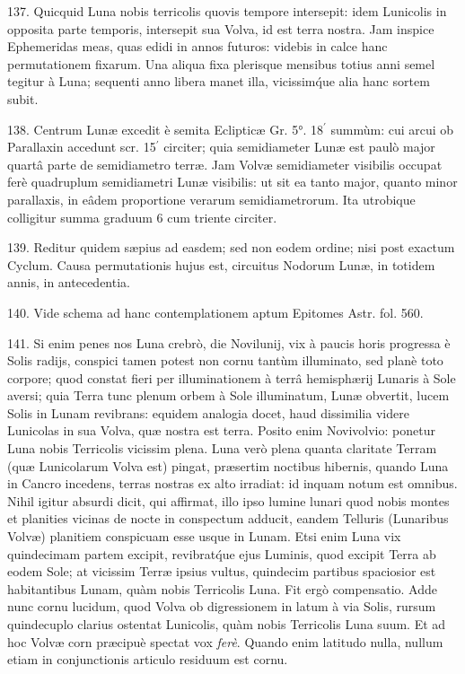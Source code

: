 \documentclass[a4paper, 11pt, oneside, polutonikogreek, german]{article}
\begin{document}
137. Quicquid Luna nobis terricolis quovis tempore intersepit: idem Lunicolis in opposita parte temporis, intersepit sua Volva, id est terra nostra. Jam inspice Ephemeridas meas, quas edidi in annos futuros: videbis in calce hanc permutationem fixarum. Una aliqua fixa plerisque mensibus totius anni semel tegitur à Luna; sequenti anno libera manet illa, vicissim\'que alia hanc sortem subit.

138. Centrum Lunæ excedit è semita Eclipticæ Gr. 5°. 18$^{\prime}$ summùm: cui arcui ob Parallaxin accedunt scr. 15$^{\prime}$ circiter; quia semidiameter Lunæ est paulò major quartâ parte de semidiametro terræ. Jam Volvæ semidiameter visibilis occupat ferè quadruplum semidiametri Lunæ visibilis: ut sit ea tanto major, quanto minor parallaxis, in eâdem proportione verarum semidiametrorum. Ita utrobique colligitur summa graduum 6 cum triente circiter.

139. Reditur quidem sæpius ad easdem; sed non eodem ordine; nisi post exactum Cyclum. Causa permutationis hujus est, circuitus Nodorum Lunæ, in totidem annis, in antecedentia.

140. Vide schema ad hanc contemplationem aptum Epitomes Astr. fol. 560.

141. Si enim penes nos Luna crebrò, die Novilunij, vix à paucis horis progressa è Solis radijs, conspici tamen potest non cornu tantùm illuminato, sed planè toto corpore; quod constat fieri per illuminationem à terrâ hemisphærij Lunaris à Sole aversi; quia Terra tunc plenum orbem à Sole illuminatum, Lunæ obvertit, lucem Solis in Lunam revibrans: equidem analogia docet, haud dissimilia videre Lunicolas in sua Volva, quæ nostra est terra. Posito enim Novivolvio: ponetur Luna nobis Terricolis vicissim plena. Luna verò plena quanta claritate Terram (quæ Lunicolarum Volva est) pingat, præsertim noctibus hibernis, quando Luna in Cancro incedens, terras nostras ex alto irradiat: id inquam notum est omnibus. Nihil igitur absurdi dicit, qui affirmat, illo ipso lumine lunari quod nobis montes et planities vicinas de nocte in conspectum adducit, eandem Telluris (Lunaribus Volvæ) planitiem conspicuam esse usque in Lunam. Etsi enim Luna vix quindecimam partem excipit, revibrat\'que ejus Luminis, quod excipit Terra ab eodem Sole; at vicissim Terræ ipsius vultus, quindecim partibus spaciosior est habitantibus Lunam, quàm nobis Terricolis Luna. Fit ergò compensatio. Adde nunc cornu lucidum, quod Volva ob digressionem in latum à via Solis, rursum quindecuplo clarius ostentat Lunicolis, quàm nobis Terricolis Luna suum. Et ad hoc Volvæ corn præcipuè spectat vox \emph{ferè}. Quando enim latitudo nulla, nullum etiam in conjunctionis articulo residuum est cornu.
\end{document}
